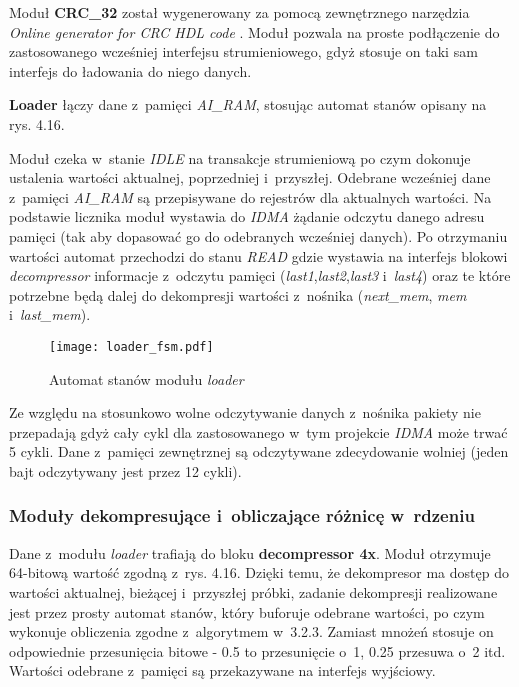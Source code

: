 Moduł \textbf{CRC\_32} został wygenerowany za pomocą zewnętrznego narzędzia \textit{Online generator for CRC HDL code} \cite{CRC_32}. Moduł pozwala na proste podłączenie do zastosowanego wcześniej interfejsu strumieniowego, gdyż stosuje on taki sam interfejs do ładowania do niego danych.

\textbf{Loader} łączy dane z~pamięci \textit{AI\_RAM}, stosując automat stanów opisany na rys. 4.16.

Moduł czeka w~stanie \textit{IDLE} na transakcje strumieniową po czym dokonuje ustalenia wartości aktualnej, poprzedniej i~przyszłej. Odebrane wcześniej dane z~pamięci \textit{AI\_RAM} są przepisywane do rejestrów dla aktualnych wartości. Na podstawie licznika moduł wystawia do \textit{IDMA} żądanie odczytu danego adresu pamięci (tak aby dopasować go do odebranych wcześniej danych). Po otrzymaniu wartości automat przechodzi do stanu \textit{READ} gdzie wystawia na interfejs blokowi \textit{decompressor} informacje z~odczytu pamięci (\textit{last1},\textit{last2},\textit{last3} i~\textit{last4}) oraz te które potrzebne będą dalej do dekompresji wartości z~nośnika (\textit{next\_mem}, \textit{mem} i~\textit{last\_mem}).

\begin{figure}[h]
	\centering
	\texttt{[image: loader\_fsm.pdf]}
	\caption{Automat stanów modułu \textit{loader}}
\end{figure}
\FloatBarrier %



Ze względu na stosunkowo wolne odczytywanie danych z~nośnika pakiety nie przepadają gdyż cały cykl dla zastosowanego w~tym projekcie \textit{IDMA} może trwać 5 cykli. Dane z~pamięci zewnętrznej są odczytywane zdecydowanie wolniej (jeden bajt odczytywany jest przez 12 cykli).

\subsubsection{Moduły dekompresujące i~obliczające różnicę w~rdzeniu}

Dane z~modułu \textit{loader} trafiają do bloku \textbf{decompressor 4x}. Moduł otrzymuje 64-bitową wartość zgodną z~rys. 4.16. Dzięki temu, że dekompresor ma dostęp do wartości aktualnej, bieżącej i~przyszłej próbki, zadanie dekompresji realizowane jest przez prosty automat stanów, który buforuje odebrane wartości, po czym wykonuje obliczenia zgodne z~algorytmem w~3.2.3. Zamiast mnożeń stosuje on odpowiednie przesunięcia bitowe - 0.5 to przesunięcie o~1, 0.25 przesuwa o~2 itd. Wartości odebrane z~pamięci są przekazywane na interfejs wyjściowy.

